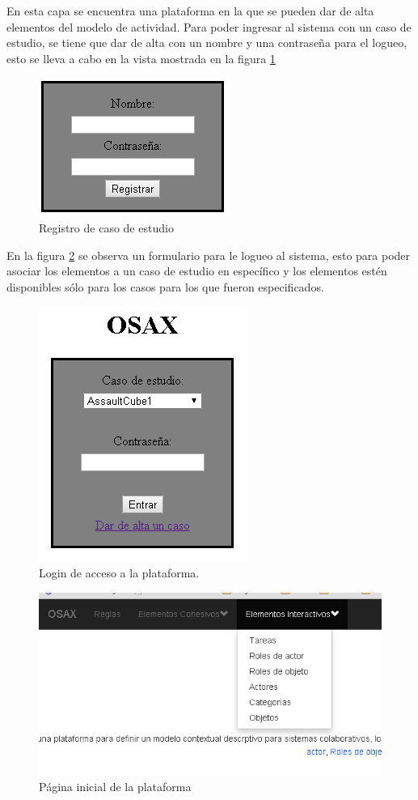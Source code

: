 En esta capa se encuentra una plataforma en la que se pueden dar de alta elementos del modelo de actividad. Para poder ingresar al sistema con un caso de estudio, se tiene que dar de alta con un nombre y una contrase\~na para el logueo, esto se lleva a cabo en la vista mostrada en la figura \ref{Ptf:registro}

\begin{figure}
\includegraphics{images/RegistroProto.png}
\caption{Registro de caso de estudio}
\label{Ptf:registro}
\end{figure}

En la figura \ref{Ptf:login} se observa un formulario para le logueo al sistema, esto para poder asociar los elementos a un caso de estudio en espec\'ifico y los elementos est\'en disponibles s\'olo para los casos para los que fueron especificados.

\begin{figure}[h!]
\includegraphics{images/LoginProto.png}
\caption{Login de acceso a la plataforma.}
\label{Ptf:login}
\end{figure}

\begin{figure}[h!]
\includegraphics[scale=.6]{images/homeProto.png}
\caption{P\'agina inicial de la plataforma}
\label{Ptf:home}
\end{figure}

